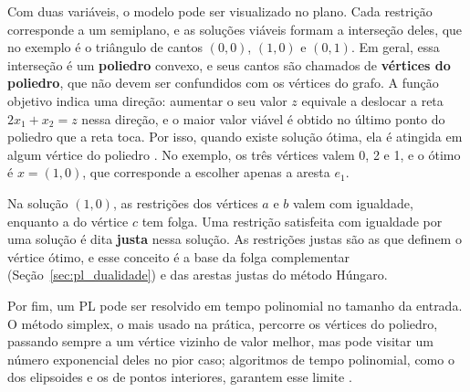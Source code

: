 Com duas variáveis, o modelo pode ser visualizado no plano. Cada restrição corresponde a um semiplano, e as soluções viáveis formam a interseção deles, que no exemplo é o triângulo de cantos $(0, 0)$, $(1, 0)$ e $(0, 1)$. Em geral, essa interseção é um \textbf{poliedro} convexo, e seus cantos são chamados de \textbf{vértices do poliedro}, que não devem ser confundidos com os vértices do grafo. A função objetivo indica uma direção: aumentar o seu valor $z$ equivale a deslocar a reta $2x_1 + x_2 = z$ nessa direção, e o maior valor viável é obtido no último ponto do poliedro que a reta toca. Por isso, quando existe solução ótima, ela é atingida em algum vértice do poliedro \cite{cormen}. No exemplo, os três vértices valem 0, 2 e 1, e o ótimo é $x = (1, 0)$, que corresponde a escolher apenas a aresta $e_1$.

Na solução $(1, 0)$, as restrições dos vértices $a$ e $b$ valem com igualdade, enquanto a do vértice $c$ tem folga. Uma restrição satisfeita com igualdade por uma solução é dita \textbf{justa} nessa solução. As restrições justas são as que definem o vértice ótimo, e esse conceito é a base da folga complementar (Seção~\ref{sec:pl_dualidade}) e das arestas justas do método Húngaro.

Por fim, um PL pode ser resolvido em tempo polinomial no tamanho da entrada. O método simplex, o mais usado na prática, percorre os vértices do poliedro, passando sempre a um vértice vizinho de valor melhor, mas pode visitar um número exponencial deles no pior caso; algoritmos de tempo polinomial, como o dos elipsoides e os de pontos interiores, garantem esse limite \cite{cormen}.



